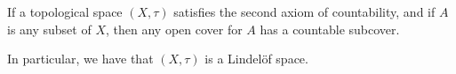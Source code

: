 \documentclass{article}
\begin{document}
If a topological space $(X,\tau)$ satisfies the second axiom of countability, and if $A$ is any subset of $X$, then any open cover for $A$ has a countable subcover. 

In particular, we have that $(X,\tau)$ is a Lindel\"of space.
\end{document}
